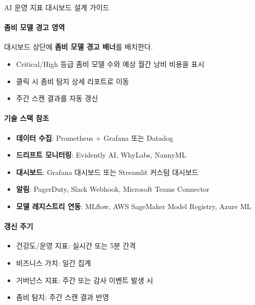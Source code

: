 \begin{practicaltool}{AI 운영 지표 대시보드 설계 가이드}
\paragraph{좀비 모델 경고 영역}
대시보드 상단에 \textbf{좀비 모델 경고 배너}를 배치한다.

\begin{itemize}
 \item Critical/High 등급 좀비 모델 수와 예상 월간 낭비 비용을 표시
 \item 클릭 시 좀비 탐지 상세 리포트로 이동
 \item 주간 스캔 결과를 자동 갱신
\end{itemize}

\paragraph{기술 스택 참조}
\begin{itemize}
 \item \textbf{데이터 수집}: Prometheus + Grafana 또는 Datadog
 \item \textbf{드리프트 모니터링}: Evidently AI, WhyLabs, NannyML
 \item \textbf{대시보드}: Grafana 대시보드 또는 Streamlit 커스텀 대시보드
 \item \textbf{알림}: PagerDuty, Slack Webhook, Microsoft Teams Connector
 \item \textbf{모델 레지스트리 연동}: MLflow, AWS SageMaker Model Registry, Azure ML
\end{itemize}

\paragraph{갱신 주기}
\begin{itemize}
 \item 건강도/운영 지표: 실시간 또는 5분 간격
 \item 비즈니스 가치: 일간 집계
 \item 거버넌스 지표: 주간 또는 감사 이벤트 발생 시
 \item 좀비 탐지: 주간 스캔 결과 반영
\end{itemize}
\end{practicaltool}


